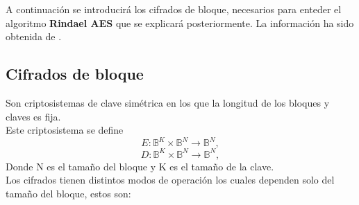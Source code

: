 A continuación se introducirá los cifrados de bloque, necesarios para enteder el algoritmo \textbf{Rindael AES} que se explicará posteriormente. La información ha sido obtenida de \cite{apuntesCriptografia}.

\subsection{Cifrados de bloque}
Son criptosistemas de clave simétrica en los que la longitud de los bloques y claves es fija.\\
Este criptosistema se define
$$
	E:\mathbb{B}^K\times\mathbb{B}^N\rightarrow \mathbb{B}^N,
$$
$$
	D:\mathbb{B}^K\times\mathbb{B}^N\rightarrow \mathbb{B}^N,
$$
Donde N es el tamaño del bloque y K es el tamaño de la clave.\\
Los cifrados tienen distintos modos de operación los cuales dependen solo del tamaño del bloque, estos son:\\

